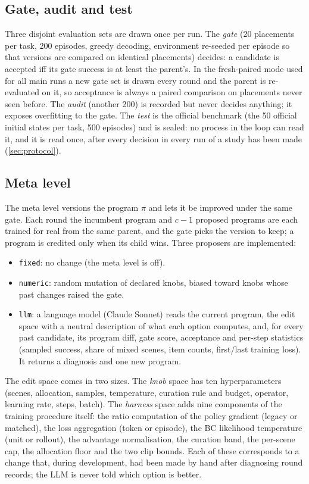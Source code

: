\subsection{Gate, audit and test}
Three disjoint evaluation sets are drawn once per run. The \emph{gate} (20 placements per task, 200 episodes, greedy decoding, environment re-seeded per episode so that versions are compared on identical placements) decides: a candidate is accepted iff its gate success is at least the parent's. In the fresh-paired mode used for all main runs a new gate set is drawn every round and the parent is re-evaluated on it, so acceptance is always a paired comparison on placements never seen before. The \emph{audit} (another 200) is recorded but never decides anything; it exposes overfitting to the gate. The \emph{test} is the official benchmark (the 50 official initial states per task, 500 episodes) and is sealed: no process in the loop can read it, and it is read once, after every decision in every run of a study has been made (\cref{sec:protocol}).

\subsection{Meta level}
The meta level versions the program $\pi$ and lets it be improved under the same gate. Each round the incumbent program and $c{-}1$ proposed programs are each trained for real from the same parent, and the gate picks the version to keep; a program is credited only when its child wins. Three proposers are implemented:
\begin{itemize}[nosep]
  \item \texttt{fixed}: no change (the meta level is off).
  \item \texttt{numeric}: random mutation of declared knobs, biased toward knobs whose past changes raised the gate.
  \item \texttt{llm}: a language model (Claude Sonnet) reads the current program, the edit space with a neutral description of what each option computes, and, for every past candidate, its program diff, gate score, acceptance and per-step statistics (sampled success, share of mixed scenes, item counts, first/last training loss). It returns a diagnosis and one new program.
\end{itemize}
The edit space comes in two sizes. The \emph{knob} space has ten hyperparameters (scenes, allocation, samples, temperature, curation rule and budget, operator, learning rate, steps, batch). The \emph{harness} space adds nine components of the training procedure itself: the ratio computation of the policy gradient (legacy or matched), the loss aggregation (token or episode), the BC likelihood temperature (unit or rollout), the advantage normalisation, the curation band, the per-scene cap, the allocation floor and the two clip bounds. Each of these corresponds to a change that, during development, had been made by hand after diagnosing round records; the LLM is never told which option is better.

